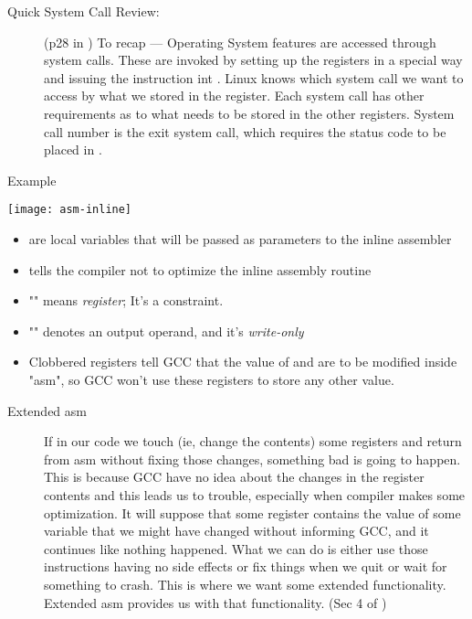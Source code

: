 \begin{description}
\item[Quick System Call Review:] (p28 in \cite{bartlett2009programming}) To recap ---
  Operating System features are accessed through system calls. These are invoked by
  setting up the registers in a special way and issuing the instruction int
  . Linux knows which system call we want to access by what we stored in the
   register. Each system call has other requirements as to what needs to be
  stored in the other registers. System call number  is the exit system call,
  which requires the status code to be placed in .
\end{description}

\begin{frame}
  \begin{block}{Example}
    \begin{center}
      \texttt{[image: asm-inline]}
    \end{center}
  \end{block}
  \begin{itemize}
  \item {} are local variables that will be passed as
    parameters to the inline assembler
  \item {} tells the compiler not to optimize the inline assembly routine
  \item "" means \emph{register}; It's a constraint.
  \item "\code{=}" denotes an output operand, and it's \emph{write-only}
  \item Clobbered registers tell GCC that the value of  and  are
    to be modified inside "asm", so GCC won’t use these registers to store any other
    value.
  \end{itemize}
\end{frame}

\begin{description}
\item[Extended asm] If in our code we touch (ie, change the contents) some registers and
  return from asm without fixing those changes, something bad is going to happen. This is
  because GCC have no idea about the changes in the register contents and this leads us to
  trouble, especially when compiler makes some optimization. It will suppose that some
  register contains the value of some variable that we might have changed without
  informing GCC, and it continues like nothing happened. What we can do is either use
  those instructions having no side effects or fix things when we quit or wait for
  something to crash. This is where we want some extended functionality. Extended asm
  provides us with that functionality. (Sec 4 of \cite{gcc-inline-asm})
\end{description}

